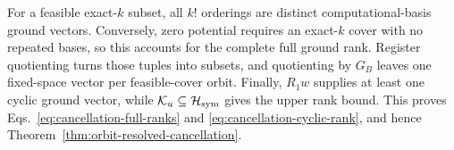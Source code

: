 For a feasible exact-$k$ subset, all $k!$ orderings are distinct
computational-basis ground vectors.  Conversely, zero potential requires
an exact-$k$ cover with no repeated bases, so this accounts for the complete
full ground rank.  Register quotienting turns those tuples into subsets,
and quotienting by $G_B$ leaves one fixed-space vector per feasible-cover
orbit.  Finally, $R_1w$ supplies at least one cyclic ground vector, while
$\mathcal K_u\subseteq\mathcal H_{\rm sym}$ gives the upper rank bound.
This proves Eqs.~\eqref{eq:cancellation-full-ranks} and
\eqref{eq:cancellation-cyclic-rank}, and hence
Theorem~\ref{thm:orbit-resolved-cancellation}.
